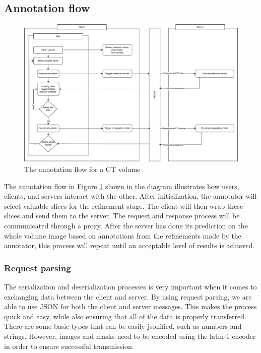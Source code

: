\subsection{Annotation flow}
\begin{figure}[h]
    \centering
    \includegraphics[width=\textwidth]{content/resources/new_images/application/Annotation_flow.pdf}
    \caption{The annotation flow for a CT volume}
    \label{fig:anno_flow}
\end{figure}
The annotation flow in Figure \ref{fig:anno_flow} shown in the diagram illustrates how users, clients, and servers interact with the other. After initialization, the annotator will select valuable slices for the refinement stage. The client will then wrap these slices and send them to the server. The request and response process will be communicated through a proxy. After the server has done its prediction on the whole volume image based on annotations from the refinements made by the annotator, this process will repeat until an acceptable level of results is achieved.

\subsubsection{Request parsing}
The serialization and deserialization processes is very important when it comes to exchanging data between the client and server. By using request parsing, we are able to use JSON for both the client and server messages. This makes the process quick and easy, while also ensuring that all of the data is properly transferred. There are some basic types that can be easily jsonified, such as numbers and strings. However, images and masks need to be encoded using the latin-1 encoder in order to ensure successful transmission.
